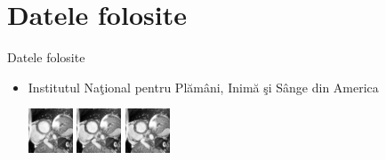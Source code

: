 \documentclass[xcolor=svgnames,handout]{beamer}
\begin{document}
\section
  {Datele folosite}

\begin{frame}
  {Datele folosite}

\begin{itemize}
\item Institutul Na\c{t}ional pentru Pl\u{a}m\^{a}ni, Inim\u{a} \c{s}i S\^{a}nge din America
  \begin{center}
    \includegraphics[width=50]{1.png}
    \hspace{0.15cm}
    \includegraphics[width=50]{3.png}
    \hspace{0.15cm}
    \includegraphics[width=50]{5.png}
    \hspace{0.15cm}

\end{center}
\end{itemize}
\end{frame}
\end{document}
